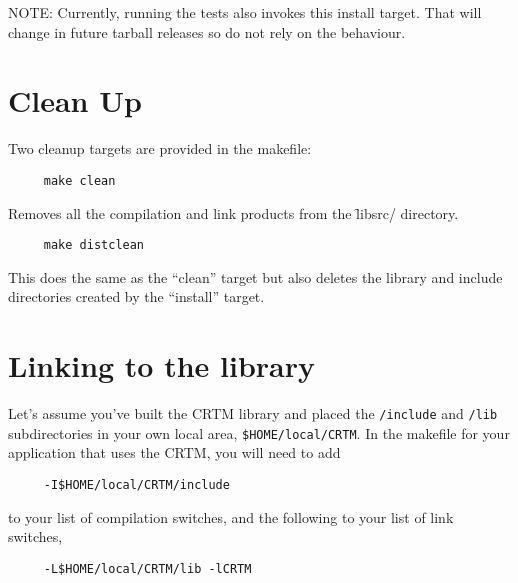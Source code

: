 NOTE: Currently, running the tests also invokes this install target. That will change in future tarball releases so do not rely on the behaviour.


\section{Clean Up}
Two cleanup targets are provided in the makefile:

\begin{verbatim}     make clean\end{verbatim}
  
Removes all the compilation and link products from the \f{libsrc/} directory.

\begin{verbatim}     make distclean\end{verbatim} 
  
This does the same as the ``clean'' target but also deletes the library and include directories created by the ``install'' target.


\section{Linking to the library}
Let's assume you've built the CRTM library and placed the \texttt{/include} and \texttt{/lib} subdirectories in your own local area, \texttt{\$HOME/local/CRTM}. In the makefile for your application that uses the CRTM, you will need to add
\begin{verbatim}     -I$HOME/local/CRTM/include\end{verbatim}
to your list of compilation switches, and the following to your list of link switches,
\begin{verbatim}     -L$HOME/local/CRTM/lib -lCRTM\end{verbatim}
